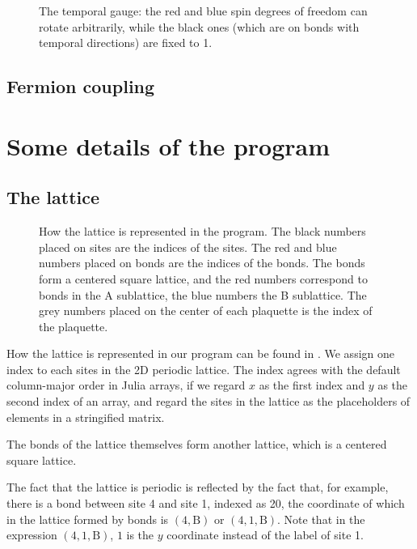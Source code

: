 \documentclass[hyperref, a4paper]{article}
\begin{document}
\begin{figure}
    \centering
    
    \caption{The temporal gauge: the red and blue spin degrees of freedom can rotate arbitrarily, while the black ones (which are on bonds with temporal directions) are fixed to 1. }
    \label{fig:temporal-gauge}
\end{figure}

\subsection{Fermion coupling}

\section{Some details of the program}

\subsection{The lattice}

\begin{figure}
    
    \caption{How the lattice is represented in the program. 
    The black numbers placed on sites are the indices of the sites.
    The red and blue numbers placed on bonds are the indices of the bonds. The bonds form a centered square lattice, and the red numbers correspond to bonds in the A sublattice, the blue numbers the B sublattice.
    The grey numbers placed on the center of each plaquette is the index of the plaquette.}
    \label{fig:label-representation}
\end{figure}

How the lattice is represented in our program can be found in .
We assign one index to each sites in the 2D periodic lattice.
The index agrees with the default column-major order in Julia arrays, if we regard $x$ as the first index and $y$ as the second index of an array, and regard the sites in the lattice as the placeholders of elements in a stringified matrix.

The bonds of the lattice themselves form another lattice, which is a centered square lattice.

The fact that the lattice is periodic is reflected by the fact that, for example, there is a bond between site 4 and site 1, indexed as 20, the coordinate of which in the lattice formed by bonds is $(4, \text{B})$ or $(4, 1, \text{B})$.
Note that in the expression $(4, 1, \text{B})$, $1$ is the $y$ coordinate instead of the label of site 1.
\end{document}
